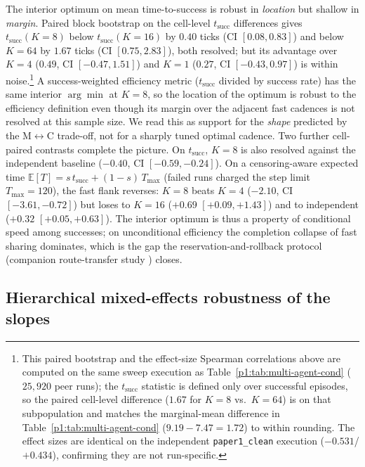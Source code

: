 \documentclass{article}
\begin{document}
The interior optimum on mean time-to-success is robust in \emph{location} but shallow in \emph{margin}. Paired block bootstrap on the cell-level $t_{\mathrm{succ}}$ differences gives $t_{\mathrm{succ}}(K{=}8)$ below $t_{\mathrm{succ}}(K{=}16)$ by $0.40$ ticks (CI $[0.08,0.83]$) and below $K{=}64$ by $1.67$ ticks (CI $[0.75,2.83]$), both resolved; but its advantage over $K{=}4$ ($0.49$, CI $[-0.47,1.51]$) and $K{=}1$ ($0.27$, CI $[-0.43,0.97]$) is within noise.\footnote{This paired bootstrap and the effect-size Spearman correlations above are computed on the same sweep execution as Table~\ref{p1:tab:multi-agent-cond} ($25{,}920$ peer runs); the $t_{\mathrm{succ}}$ statistic is defined only over successful episodes, so the paired cell-level difference ($1.67$ for $K{=}8$ vs.\ $K{=}64$) is on that subpopulation and matches the marginal-mean difference in Table~\ref{p1:tab:multi-agent-cond} ($9.19{-}7.47{=}1.72$) to within rounding. The effect sizes are identical on the independent \texttt{paper1\_clean} execution ($-0.531$/$+0.434$), confirming they are not run-specific.} A success-weighted efficiency metric ($t_{\mathrm{succ}}$ divided by success rate) has the same interior $\arg\min$ at $K{=}8$, so the location of the optimum is robust to the efficiency definition even though its margin over the adjacent fast cadences is not resolved at this sample size. We read this as support for the \emph{shape} predicted by the M$\leftrightarrow$C trade-off, not for a sharply tuned optimal cadence. Two further cell-paired contrasts complete the picture. On $t_{\mathrm{succ}}$, $K{=}8$ is also resolved against the independent baseline ($-0.40$, CI $[-0.59,-0.24]$). On a censoring-aware expected time $\mathbb{E}[T] = s\,t_{\mathrm{succ}} + (1-s)\,T_{\max}$ (failed runs charged the step limit $T_{\max}{=}120$), the fast flank reverses: $K{=}8$ beats $K{=}4$ ($-2.10$, CI $[-3.61,-0.72]$) but loses to $K{=}16$ ($+0.69$ $[+0.09,+1.43]$) and to independent ($+0.32$ $[+0.05,+0.63]$). The interior optimum is thus a property of conditional speed among successes; on unconditional efficiency the completion collapse of fast sharing dominates, which is the gap the reservation-and-rollback protocol (companion route-transfer study \citep{songlines2}) closes.

\subsection{Hierarchical mixed-effects robustness of the slopes}
\label{p1:app:hierarchical}
\end{document}
